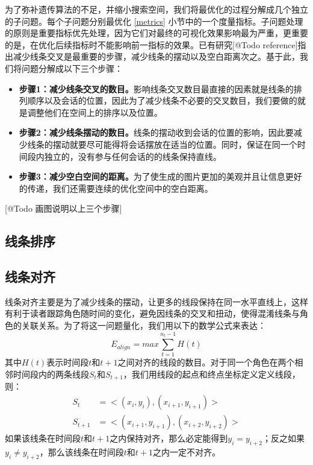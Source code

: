 为了弥补遗传算法的不足，并缩小搜索空间，我们将最优化的过程分解成几个独立的子问题。每个子问题分别最优化 \ref{metrics} 小节中的一个度量指标。子问题处理的原则是重要指标优先处理，因为它们对最终的可视化效果影响最为严重，更重要的是，在优化后续指标时不能影响前一指标的效果。已有研究[@Todo reference]指出减少线条交叉是最重要的步骤，减少线条的摆动以及空白距离次之。基于此，我们将问题分解成以下三个步骤：
\begin{itemize}
\item \textbf{步骤1：减少线条交叉的数目。}影响线条交叉数目最直接的因素就是线条的排列顺序以及会话的位置，因此为了减少线条不必要的交叉数目，我们要做的就是调整他们在空间上的排序以及位置。
\item \textbf{步骤2：减少线条摆动的数目。}线条的摆动收到会话的位置的影响，因此要减少线条的摆动就要尽可能得将会话摆放在适当的位置。同时，保证在同一个时间段内独立的，没有参与任何会话的的线条保持直线。
\item \textbf{步骤3：减少空白空间的距离。}为了使生成的图片更加的美观并且让信息更好的传递，我们还需要连续的优化空间中的空白距离。
\end{itemize}
 
 [@Todo 画图说明以上三个步骤]
 
\subsection{线条排序}

\subsection{线条对齐}
线条对齐主要是为了减少线条的摆动，让更多的线段保持在同一水平直线上，这样有利于读者跟踪角色随时间的变化，避免因线条的交叉和扭动，使得混淆线条与角色的关联关系。为了将这一问题量化，我们用以下的数学公式来表达：
\begin{equation}
\label{align-global}
E_{align} = max \sum_{t=1}^{n_t-1} H\left(t\right)
\end{equation}
其中$H\left(t\right)$表示时间段$t$和$t+1$之间对齐的线段的数目。对于同一个角色在两个相邻时间段内的两条线段$S_t$和$S_{t+1}$，我们用线段的起点和终点坐标定义定义线段，则：
\begin{subequations}
\begin{align}
	S_t & = <(x_i, y_i), (x_{i+1},y_{i+1})> \label{eq:segment-1}\\
	S_{t+1} & = <(x_{i+1}, y_{i+1}), (x_{i+2},y_{i+2})> \label{eq:segment-2}
\end{align}
\end{subequations}
如果该线条在时间段$t$和$t+1$之内保持对齐，那么必定能得到$y_i = y_{i+2}$；反之如果$y_i \neq y_{i+2}$，那么该线条在时间段$t$和$t+1$之内一定不对齐。

